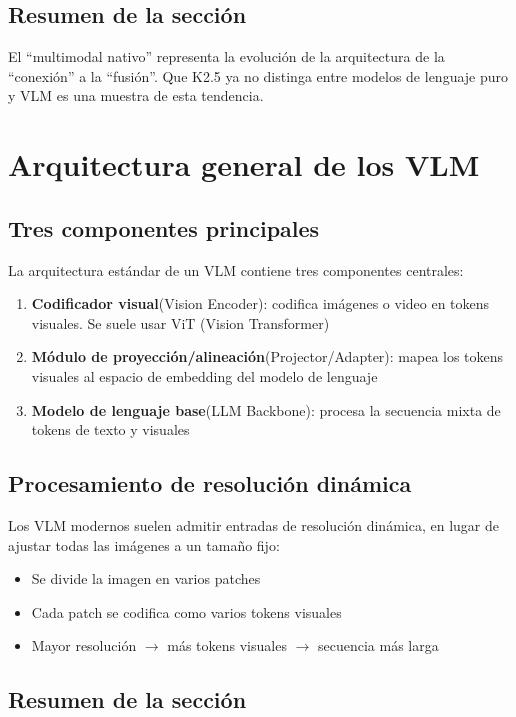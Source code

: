 \documentclass[a4paper]{article}
\begin{document}
\subsection{Resumen de la sección}

El ``multimodal nativo'' representa la evolución de la arquitectura de la ``conexión'' a la ``fusión''. Que K2.5 ya no distinga entre modelos de lenguaje puro y VLM es una muestra de esta tendencia.

\section{Arquitectura general de los VLM}

\subsection{Tres componentes principales}

La arquitectura estándar de un VLM contiene tres componentes centrales:

\begin{enumerate}
  \item \textbf{Codificador visual}(Vision Encoder): codifica imágenes o video en tokens visuales. Se suele usar ViT (Vision Transformer)
  \item \textbf{Módulo de proyección/alineación}(Projector/Adapter): mapea los tokens visuales al espacio de embedding del modelo de lenguaje
  \item \textbf{Modelo de lenguaje base}(LLM Backbone): procesa la secuencia mixta de tokens de texto y visuales
\end{enumerate}

\subsection{Procesamiento de resolución dinámica}

Los VLM modernos suelen admitir entradas de resolución dinámica, en lugar de ajustar todas las imágenes a un tamaño fijo:
\begin{itemize}
  \item Se divide la imagen en varios patches
  \item Cada patch se codifica como varios tokens visuales
  \item Mayor resolución $\to$ más tokens visuales $\to$ secuencia más larga
\end{itemize}

\subsection{Resumen de la sección}
\end{document}
